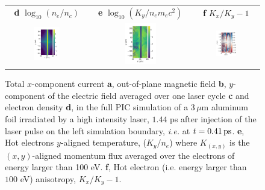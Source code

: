\documentclass[aps,showpacs,superscriptaddress]{revtex4}
\begin{document}
\begin{figure}
{\begin{tabular}{ccc}
 \textbf{d} $\log_{10}(n_e/n_c)$ &\textbf{e} $\log_{10}(K_y/n_em_ec^2)$&\textbf{f} $K_x/K_y-1$ \\
 \includegraphics[width=0.33\textwidth]{ne_t104000_nat.png} 
 &\includegraphics[width=0.33\textwidth]{Ty_t104000_nat.png} 
 &\includegraphics[width=0.33\textwidth]{a_t104000_nat.png} 
\end{tabular}} 
\caption{\label{fig:PIC_las}
Total $x$-component current \textbf{a}, out-of-plane magnetic field \textbf{b}, $y$-component of the electric field averaged over one laser cycle \textbf{c} and electron density \textbf{d},  in the full PIC simulation of a $3\, \mu$m aluminum foil irradiated by a high intensity laser, $1.44$ ps after injection of the laser pulse on the left simulation boundary, \emph{i.e.} at $t=0.41\,\rm ps$. 
\textbf{e}, Hot electrons  $y$-aligned temperature, ($K_y/ n_e$) where $K_{(x,y)}$ is the $(x,y)$-aligned momentum flux  averaged over the electrons of energy larger than 100 eV.
\textbf{f}, Hot electron (i.e. energy larger than $100$ eV) anisotropy, $K_x/K_y -1$.
}
\end{figure}
\end{document}
